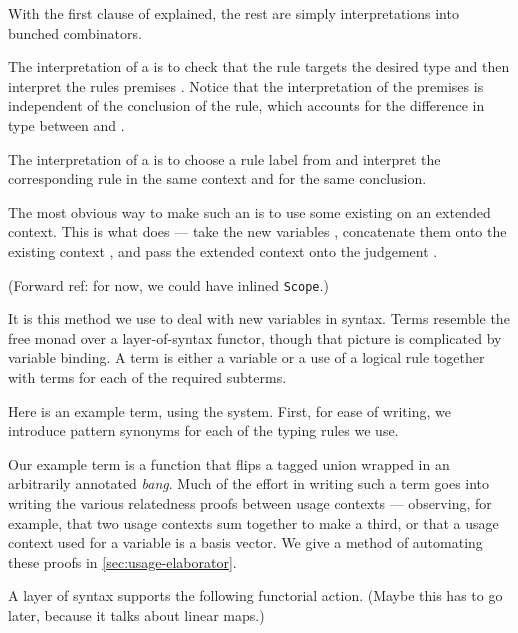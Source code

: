With the first clause of  explained,
the rest are simply interpretations into bunched combinators.


The interpretation of a  is to check that the rule targets
the desired type and then interpret the rules premises .
Notice that the interpretation of the premises is independent of the conclusion
of the rule, which accounts for the difference in type between
 and
.


The interpretation of a  is to choose a rule label
 from  and interpret the corresponding rule
\AgdaSpace{} in the same context and for the same
conclusion.


The most obvious way to make such an  is to use some existing
 on an extended context.
This is what  does --- take the new variables
\AgdaBound{$\Delta$}, concatenate them onto the existing context
\AgdaBound{$\Gamma$}, and pass the extended context onto the judgement
.


{\color{red}(Forward ref: for now, we could have inlined \texttt{Scope}.)}

It is this method we use to deal with new variables in syntax.
Terms resemble the free monad over a layer-of-syntax functor, though that
picture is complicated by variable binding.
A term is either a variable or a use of a logical rule together with terms
for each of the required subterms.


Here is an example term, using the  system.
First, for ease of writing, we introduce pattern synonyms for each of the
typing rules we use.


Our example term is a function that flips a tagged union wrapped in an
arbitrarily annotated \emph{bang}.
Much of the effort in writing such a term goes into writing the various
relatedness proofs between usage contexts --- observing, for example, that two
usage contexts sum together to make a third, or that a usage context used for
a variable is a basis vector.
We give a method of automating these proofs in \cref{sec:usage-elaborator}.


A layer of syntax supports the following functorial action.
{\color{red}(Maybe this has to go later, because it talks about linear maps.)}

